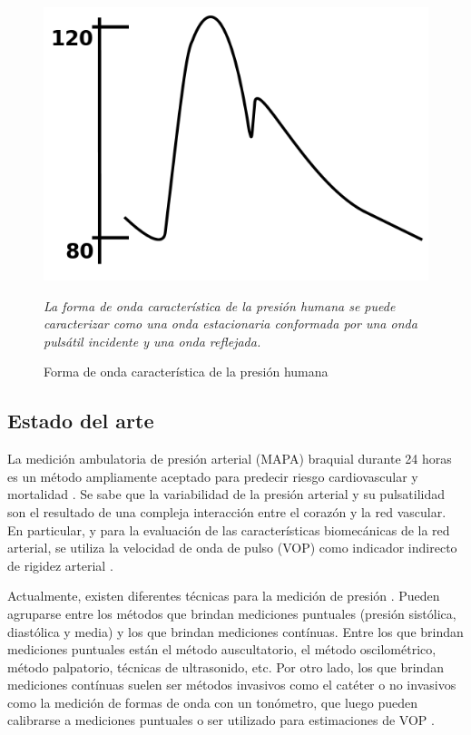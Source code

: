\begin{figure}[!htbp]
	\centering
	\begin{minipage}{0.65\textwidth}
		\includegraphics[width=\textwidth]{./Figures/periodopresion.png}
	{\footnotesize \textit{	La forma de onda característica de la presión humana se puede caracterizar como una onda estacionaria conformada por una onda pulsátil incidente y una onda reflejada.}\par}		
	\end{minipage}
	
	\caption{Forma de onda característica de la presión humana}
	\label{fig:periodopresion}
\end{figure}


\subsection{Estado del arte}

La medición ambulatoria de presión arterial (MAPA) braquial durante 24 horas es un método ampliamente aceptado para predecir riesgo cardiovascular y mortalidad\citep{hansen2006} \citep{staensen1999} \citep{verdecchia1993}. Se sabe que la variabilidad de la presión arterial y su pulsatilidad son el resultado de una compleja interacción entre el corazón y la red vascular. En particular, y para la evaluación de las características biomecánicas de la red arterial, se utiliza la velocidad de onda de pulso (VOP) como indicador indirecto de rigidez arterial \citep{nichols2008}.

Actualmente, existen diferentes técnicas para la medición de presión \citep{ogedegbe2010}. Pueden agruparse entre los métodos que brindan mediciones puntuales (presión sistólica, diastólica y media) y los que brindan mediciones contínuas. Entre los que brindan mediciones puntuales están el método auscultatorio, el método oscilométrico, método palpatorio, técnicas de ultrasonido, etc. Por otro lado, los que brindan mediciones contínuas suelen ser métodos invasivos como el catéter o no invasivos como la medición de formas de onda con un tonómetro, que luego pueden calibrarse a mediciones puntuales o ser utilizado para estimaciones de VOP \citep{ruso2001}.

